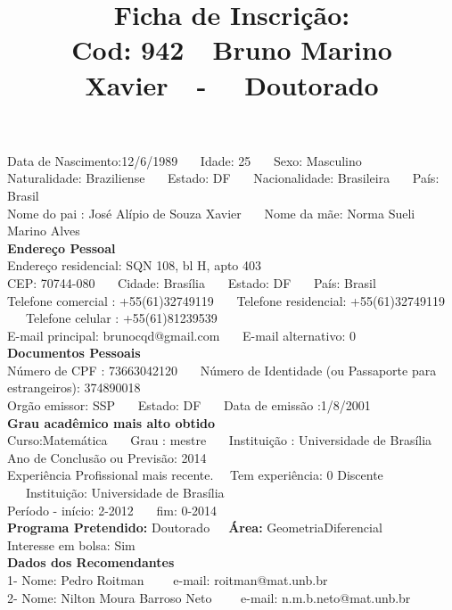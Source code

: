 \documentclass[11pt]{article}
\title{\vspace*{-4cm} Ficha de Inscrição: \\Cod: 942\ \ Bruno Marino Xavier\ \ - \ \ Doutorado 
 }
\date{}
\begin{document}
\maketitle
\vspace*{-1.5cm}
\noindent Data de Nascimento:12/6/1989
\ \ \ Idade: 25   \ \ \ Sexo: Masculino
\\
Naturalidade: Braziliense  
\ \ \  Estado: DF
\ \ \  Nacionalidade: Brasileira
\ \ \ País: Brasil
\\        
Nome do pai : José Alípio de Souza Xavier
\ \ \ Nome da mãe: Norma Sueli Marino Alves          
\\[0.2cm]                     
\textbf{Endereço Pessoal} 
\\ 
\noindent Endereço residencial: SQN 108, bl H, apto 403
\\
        CEP: 70744-080 
\ \ \ Cidade: Brasília 
\ \ \ Estado: DF 
\ \ \ País: Brasil
\\		
		Telefone comercial : +55(61)32749119
\ \ \ Telefone residencial: +55(61)32749119
\ \ \ Telefone celular : +55(61)81239539
\\
E-mail principal: brunocqd@gmail.com
\ \ \ E-mail alternativo: 0 
\\[0.2cm] 
\textbf{Documentos Pessoais}
\\
\noindent Número de CPF : 73663042120
\ \ \ Número de Identidade (ou Passaporte para estrangeiros): 374890018
\\
Orgão emissor: SSP
\ \ \ Estado: DF
\ \ \ Data de emissão :1/8/2001
\\[0.3cm]
\textbf{Grau acadêmico mais alto obtido}
\\	
Curso:Matemática
\ \ \ Grau : mestre
\ \ \ Instituição : Universidade de Brasília
\\			
Ano de Conclusão ou Previsão: 2014
\\ 
Experiência Profissional mais recente. \ \  
Tem experiência: 0 Discente  
\ \ \ Instituição: Universidade de Brasília
\\  
Período - início: 2-2012
\ \ \ fim: 0-2014
\\[0.2cm] 
\textbf{Programa Pretendido:} Doutorado\ \ \ \textbf{Área:} GeometriaDiferencial\\
Interesse em bolsa: Sim
\\[0.3cm]		
\textbf{Dados dos Recomendantes} 
\\
1- Nome: Pedro Roitman
\ \ \ \  e-mail: roitman@mat.unb.br 
\\
2- Nome: Nilton Moura Barroso Neto
\ \ \ \ e-mail: n.m.b.neto@mat.unb.br
\\
\end{document}
